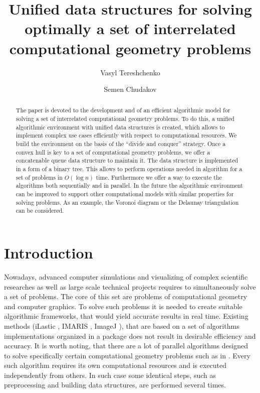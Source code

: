 \documentclass[a4paper,UKenglish,cleveref, autoref]{socg-lipics-v2019}
\title{Unified data structures for solving optimally a set of interrelated computational geometry problems}
\author{Vasyl Tereshchenko}{
	Faculty of computer science and cybernetics, Taras Shevchenko National University of Kyiv, Ukraine}
{vtereshch@gmail.com}{}{}%
\author{Semen Chudakov}{Faculty of computer science and cybernetics, Taras Shevchenko National University of Kyiv, Ukraine}
{semen.chudakov7@gmail.com}{}{}
\begin{document}
\maketitle

\begin{abstract}
	The paper is devoted to the development and  of an efficient algorithmic model for solving a set of interrelated computational geometry problems. To do this, a unified algorithmic environment with unified data structures is created, which allows to implement complex use cases efficiently with respect to computational resources. We build the environment on the basis of the ``divide and conquer'' strategy. 
	Once a convex hull is key to a set of computational geometry problems, we offer a concatenable queue data structure to maintain it. The data structure is implemented in a form of a binary tree. This allows to perform operations needed in algorithm for a set of problems in $O(\log n)$ time. Furthermore we offer a way to execute the algorithms both sequentially and in parallel.
	In the future the algorithmic environment can be improved to support other computational models with similar properties for solving problems. As an example, the Voronoi diagram or the Delaunay triangulation can be considered.
\end{abstract}

\section{Introduction}
\label{sec:introduction}

	Nowadays, advanced computer simulations and visualizing of complex scientific researches as well as large scale technical projects requires to simultaneously solve a set of problems. The core of this set are problems of computational geometry and computer graphics. To solve such problems it is needed to create suitable algorithmic frameworks, that would yield accurate results in real time. Existing methods (iLastic \cite{ilastik}, IMARIS \cite{imaris}, ImageJ \cite{imagej}), that are based on a set of algorithms implementations organized in a package does not result in desirable efficiency and accuracy. It is worth noting, that there are a lot of parallel algorithms designed to solve specifically certain computational geometry problems such as in \cite{aggarwal,atallah,cole,amato,chen,berkman,goodman,akl,jaja,leeuwen,reif}. Every such algorithm requires its own computational resources and is executed independently from others. In such case some identical steps, such as preprocessing and building data structures, are performed several times. 
	
\end{document}
